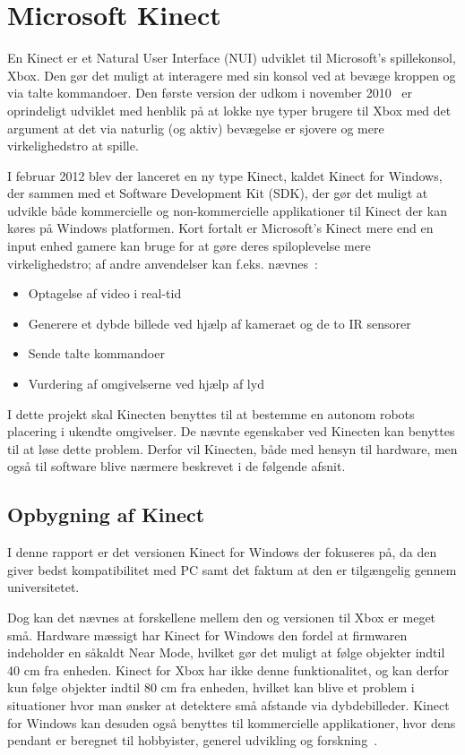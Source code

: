  \section{Microsoft Kinect}
En Kinect er et Natural User Interface (NUI) udviklet til Microsoft's spillekonsol, Xbox.
Den gør det muligt at interagere med sin konsol ved at bevæge kroppen og via talte kommandoer.
Den første version der udkom i november 2010~\cite{kinectWiki} er oprindeligt udviklet med henblik på at lokke nye typer brugere til Xbox med det argument at det via naturlig (og aktiv) bevægelse er sjovere og mere virkelighedstro at spille.

I februar 2012 blev der lanceret en ny type Kinect, kaldet Kinect for Windows, der sammen med et Software Development Kit (SDK), der gør det muligt at udvikle både kommercielle og non-kommercielle applikationer til Kinect der kan køres på Windows platformen.
Kort fortalt er Microsoft's Kinect mere end en input enhed gamere kan bruge for at gøre deres spiloplevelse mere virkelighedstro; af andre anvendelser kan f.eks. nævnes~\cite[s.~17]{kinectProgrammingGuide}:

\begin{itemize}
\item Optagelse af video i real-tid
\item Generere et dybde billede ved hjælp af kameraet og de to IR sensorer
\item Sende talte kommandoer
\item Vurdering af omgivelserne ved hjælp af lyd
\end{itemize}

I dette projekt skal Kinecten benyttes til at bestemme en autonom robots placering i ukendte omgivelser. 
De nævnte egenskaber ved Kinecten kan benyttes til at løse dette problem.
Derfor vil Kinecten, både med hensyn til hardware, men også til software blive nærmere beskrevet i de følgende afsnit.


\subsection{Opbygning af Kinect}
I denne rapport er det versionen Kinect for Windows der fokuseres på, da den giver bedst kompatibilitet med PC samt det faktum at den er tilgængelig gennem universitetet.

Dog kan det nævnes at forskellene mellem den og versionen til Xbox er meget små.
Hardware mæssigt har Kinect for Windows den fordel at firmwaren indeholder en såkaldt Near Mode, hvilket gør det muligt at følge objekter indtil 40 cm fra enheden.
Kinect for Xbox har ikke denne funktionalitet, og kan derfor kun følge objekter indtil 80 cm fra enheden, hvilket kan blive et problem i situationer hvor man ønsker at detektere små afstande via dybdebilleder.
Kinect for Windows kan desuden også benyttes til kommercielle applikationer, hvor dens pendant er beregnet til hobbyister, generel udvikling og forskning~\cite[s.~16]{kinectProgrammingGuide}.

